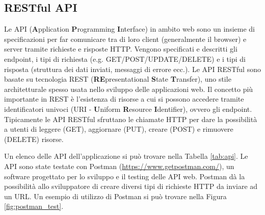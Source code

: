 \documentclass[12pt]{report}
\begin{document}
\subsection{RESTful API}\label{sec:api}
%
Le API (\textbf{A}pplication \textbf{P}rogramming \textbf{I}nterface) in ambito web sono un insieme di specificazioni per far comunicare tra di loro client (generalmente il browser) e server tramite richieste e risposte HTTP. Vengono specificati e descritti gli endpoint, i tipi di richiesta (e.g. GET/POST/UPDATE/DELETE) e i tipi di risposta (struttura dei dati inviati, messaggi di errore ecc.).
Le API RESTful sono basate su tecnologia REST (\textbf{RE}presentational \textbf{S}tate \textbf{T}ransfer), uno stile architetturale spesso usata nello sviluppo delle applicazioni web. Il concetto più importante in REST è l'esistenza di risorse a cui si possono accedere tramite identificatori univoci (URI - \textbf{U}niform \textbf{R}esource \textbf{I}dentifier), ovvero gli endpoint.
Tipicamente le API RESTful sfruttano le chiamate HTTP per dare la possibilità a utenti di leggere (GET), aggiornare (PUT), creare (POST) e rimuovere (DELETE) risorse. 

Un elenco delle API dell'applicazione si può trovare nella Tabella \ref{tab:api}.
Le API sono state testate con Postman (\url{https://www.getpostman.com/}), un software progettato per lo sviluppo e il testing delle API web. Postman dà la possibilità allo sviluppatore di creare diversi tipi di richieste HTTP da inviare ad un URL. Un esempio di utilizzo di Postman si può trovare nella Figura \ref{fig:postman_test}.
\end{document}
